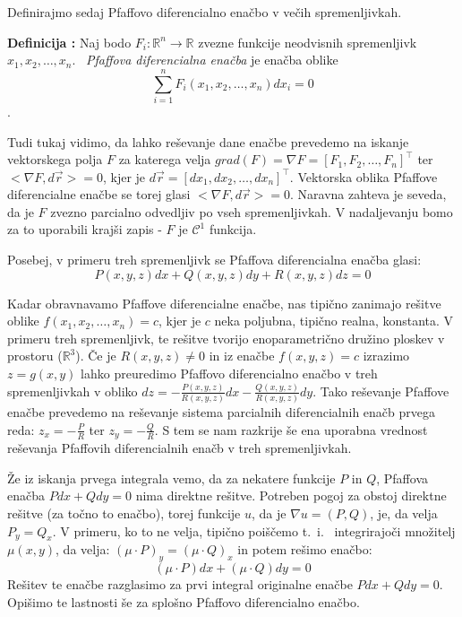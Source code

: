 \documentclass[a4paper, 10pt]{article}
\newcounter{defcount}
\newenvironment{definicija}{\begin{flushleft}\refstepcounter{defcount}\textbf{Definicija \arabic{defcount}:}}{\hfill\end{flushleft}}
\newcommand{\mth}[1]{\ensuremath{\mathbb{#1}}}
\newcommand{\R}{\mth{R}}
\newcommand{\pojem}[1]{\emph{#1}}
\newcommand{\map}[3]{\ensuremath{{#1}: {#2} \rightarrow {#3}}}
\begin{document}
			Definirajmo sedaj Pfaffovo diferencialno enačbo v večih spremenljivkah.
			
			\begin{definicija}
				\label{def:PfaffDE}
				Naj bodo $\map{F_i}{\R^n}{\R}$ zvezne funkcije neodvisnih spremenljivk $x_1, x_2, \ldots, x_n$. ~\pojem{Pfaffova diferencialna enačba} je enačba oblike $$\sum_{i = 1}^{n}F_i(x_1, x_2, \ldots, x_n) dx_i = 0$$.
			\end{definicija}
			
			Tudi tukaj vidimo, da lahko reševanje dane enačbe prevedemo na iskanje vektorskega polja $F$ za katerega velja $grad(F) = \nabla F = [F_1, F_2, \ldots, F_n]^\top$ ter $<\nabla F , d\vec{r}> = 0$, kjer je $d\vec{r} = [dx_1, dx_2, \ldots, dx_n]^\top$. Vektorska oblika Pfaffove diferencialne enačbe se torej glasi $<\nabla F, d\vec{r}> = 0$. Naravna zahteva je seveda, da je $F$ zvezno parcialno odvedljiv po vseh spremenljivkah. V nadaljevanju bomo za to uporabili krajši zapis - $F$ je $\mathcal{C}^1$ funkcija.
			
			Posebej, v primeru treh spremenljivk se Pfaffova diferencialna enačba glasi: $$P(x, y, z)dx + Q(x, y, z)dy + R(x, y, z)dz = 0$$
			
			Kadar obravnavamo Pfaffove diferencialne enačbe, nas tipično zanimajo rešitve oblike $f(x_1, x_2, \ldots, x_n) = c$, kjer je $c$ neka poljubna, tipično realna, konstanta. V primeru treh spremenljivk, te rešitve tvorijo enoparametrično družino ploskev v prostoru ($\R^3$). Če je $R(x, y, z)\neq 0$ in iz enačbe $f(x, y, z) = c$ izrazimo $z = g(x, y)$ lahko preuredimo Pfaffovo diferencialno enačbo v treh spremenljivkah v obliko $dz = -\frac{P(x, y, z)}{R(x, y, z)}dx - \frac{Q(x, y, z)}{R(x, y, z)}dy$. Tako reševanje Pfaffove enačbe prevedemo na reševanje sistema parcialnih diferencialnih enačb prvega reda: $z_x = -\frac{P}{R}$ ter $z_y = -\frac{Q}{R}$. S tem se nam razkrije še ena uporabna vrednost reševanja Pfaffovih diferencialnih enačb v treh spremenljivkah.
			
			Že iz iskanja prvega integrala vemo, da za nekatere funkcije $P$ in $Q$, Pfaffova enačba $Pdx + Qdy = 0$ nima direktne rešitve. Potreben pogoj za obstoj direktne rešitve (za točno to enačbo), torej funkcije $u$, da je $\nabla u = (P, Q)$, je, da velja $P_y = Q_x$. V primeru, ko to ne velja, tipično poiščemo t.~i.~ integrirajoči množitelj $\mu(x, y)$, da velja: $(\mu\cdot P)_y = (\mu\cdot Q)_x$ in potem rešimo enačbo: $$(\mu\cdot P)dx + (\mu\cdot Q)dy = 0$$ Rešitev te enačbe razglasimo za prvi integral originalne enačbe $Pdx + Qdy = 0$. Opišimo te lastnosti še za splošno Pfaffovo diferencialno enačbo.
			
\end{document}
